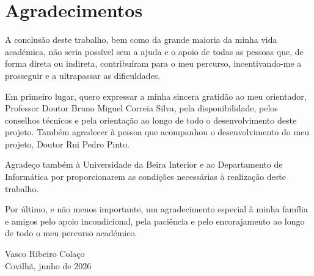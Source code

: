 \chapter*{Agradecimentos}
\label{chap:ack}


A conclusão deste trabalho, bem como da grande maioria da minha vida
académica, não seria possível sem a ajuda e o apoio de todas as pessoas que,
de forma direta ou indireta, contribuíram para o meu percurso, incentivando-me
a prosseguir e a ultrapassar as dificuldades.

Em primeiro lugar, quero expressar a minha sincera gratidão ao meu orientador,
Professor Doutor Bruno Miguel Correia Silva, pela disponibilidade, pelos
conselhos técnicos e pela orientação ao longo de todo o desenvolvimento
deste projeto.
Também agradecer à pessoa que acompanhou o desenvolvimento do meu projeto, Doutor Rui Pedro Pinto.

Agradeço também à Universidade da Beira Interior e ao Departamento de
Informática por proporcionarem as condições necessárias à realização deste
trabalho.

Por último, e não menos importante, um agradecimento especial à minha
família e amigos pelo apoio incondicional, pela paciência e pelo encorajamento
ao longo de todo o meu percurso académico.

\vspace{1cm}
\noindent Vasco Ribeiro Colaço \\
Covilhã, junho de 2026